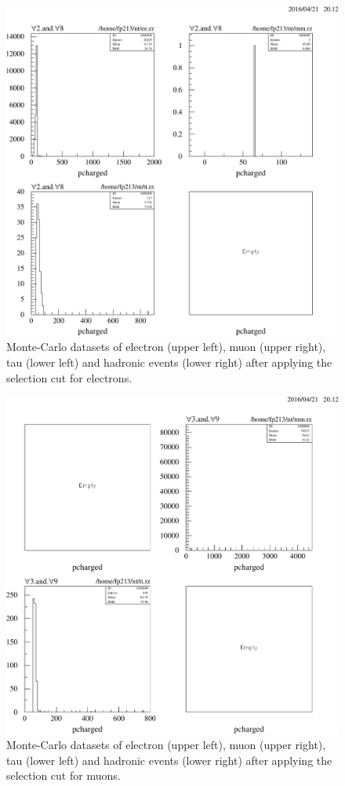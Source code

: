 \documentclass[11pt, a4paper]{article}
\numberwithin{equation}{section}
\begin{document}
\begin{appendix}
\begin{figure}[h]
	\centering
	\includegraphics[width=1\textwidth]{./data/tag2/final_cuts/cropped/electron_cut.pdf}
	\caption{Monte-Carlo datasets of electron (upper left), muon (upper right), tau (lower left) and hadronic events (lower right) after applying the selection cut for electrons.}
\end{figure}

\begin{figure}[h]
	\centering
	\includegraphics[width=1\textwidth]{./data/tag2/final_cuts/cropped/muon_cut.pdf}
	\caption{Monte-Carlo datasets of electron (upper left), muon (upper right), tau (lower left) and hadronic events (lower right) after applying the selection cut for muons.}
\end{figure}


\end{appendix}
\end{document}
